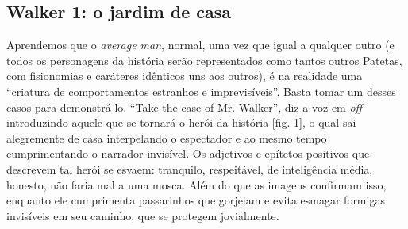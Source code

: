 \begin{multicols}{2}
\section*{Walker 1:\allowbreak{} o jardim de casa}
\par{}Aprendemos que o \textit{average man},\allowbreak{} normal,\allowbreak{} uma vez que igual a qualquer outro (\allowbreak{}e todos os personagens da história serão representados como tantos outros Patetas,\allowbreak{} com fisionomias e caráteres idênticos uns aos outros)\allowbreak{},\allowbreak{} é na realidade uma “criatura de comportamentos estranhos e imprevisíveis”.\allowbreak{} Basta tomar um desses casos para demonstrá-\allowbreak{}lo.\allowbreak{} “Take the case of Mr.\allowbreak{} Walker”,\allowbreak{} diz a voz em \textit{off} introduzindo aquele que se tornará o herói da história [fig.\allowbreak{} 1],\allowbreak{} o qual sai alegremente de casa interpelando o espectador e ao mesmo tempo cumprimentando o narrador invisível.\allowbreak{} Os adjetivos e epítetos positivos que descrevem tal herói se esvaem:\allowbreak{} tranquilo,\allowbreak{} respeitável,\allowbreak{} de inteligência média,\allowbreak{} honesto,\allowbreak{} não faria mal a uma mosca.\allowbreak{} Além do que as imagens confirmam isso,\allowbreak{} enquanto ele cumprimenta passarinhos que gorjeiam e evita esmagar formigas invisíveis em seu caminho,\allowbreak{} que se protegem jovialmente.\allowbreak{}
\par
{
}
\end{multicols}

